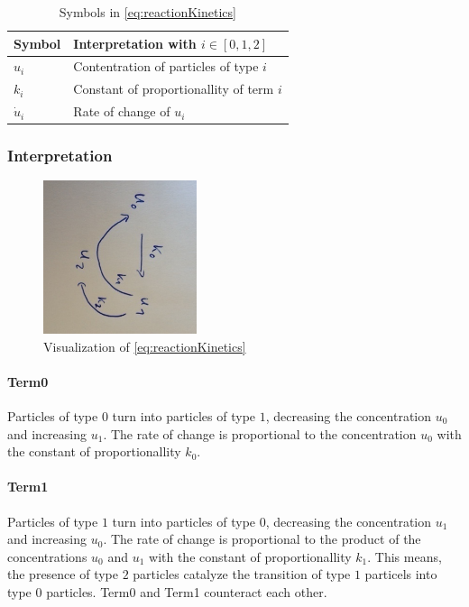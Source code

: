 \documentclass[10pt,a4paper]{article}
\begin{document}
\begin{table}[!h]
\centering
\begin{tabular}{l|l}
Symbol 		& Interpretation with $i \in [0,1,2]$\\ \hline
$u_i$		& Contentration of particles of type $i$\\
$k_i$		& Constant of proportionallity of term $i$\\
$\dot{u}_i$ & Rate of change of $u_i$
\end{tabular}
\caption{Symbols in \autoref{eq:reactionKinetics}}
\label{tab:01_symbols}
\end{table}

\subsubsection{Interpretation}

\begin{figure}[!h]
\centering
\includegraphics[width=0.4\textwidth]{01_reactionKinetics}
\caption{Visualization of \autoref{eq:reactionKinetics}}
\label{fig:01_vis}
\end{figure}

\paragraph*{Term0}
Particles of type $0$ turn into particles of type $1$,
decreasing the concentration $u_0$ and increasing $u_1$.
The rate of change is proportional to the concentration $u_0$ with the
constant of proportionallity $k_0$.

\paragraph*{Term1}
Particles of type $1$ turn into particles of type $0$,
decreasing the concentration $u_1$ and increasing $u_0$.
The rate of change is proportional to the product of the concentrations
$u_0$ and $u_1$ with the constant of proportionallity $k_1$.
This means, the presence of type $2$ particles catalyze the transition of type $1$ particels into type $0$ particles.
Term0 and Term1 counteract each other.
\end{document}
